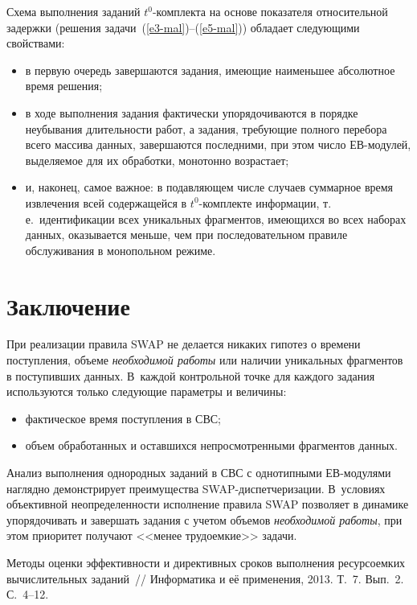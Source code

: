 \begin{multicols}{2}
Схема выполнения заданий $t^0$-ком\-плек\-та на основе показателя
относительной задержки (решения задачи~(\ref{e3-mal})--(\ref{e5-mal})) обладает следующими
свойствами:
\begin{itemize}
\item в первую очередь завершаются задания, име\-ющие наименьшее абсолютное время решения;
\item  в ходе выполнения  задания фактически упорядочиваются  в порядке неубывания 
длительности работ, а задания, требующие полного перебора всего массива данных, 
завершаются последними, при этом  число ЕВ-мо\-ду\-лей, выделяемое  для их обработки, 
монотонно воз\-рас\-тает;
\item  и, наконец, самое важное: в подавляющем чис\-ле случаев суммарное время 
извлечения всей содержащейся в $t^0$-ком\-плек\-те  информации, т.\,е.\ 
идентификации всех уникальных фрагментов, имеющихся во всех наборах данных, 
оказывается меньше, чем при последовательном правиле обслуживания в монопольном режиме.
\end{itemize}



\section{Заключение} 

При реализации правила SWAP не
делается никаких гипотез о времени поступления, объеме
\textit{необходимой работы} или наличии уникальных фрагментов в
поступивших данных. В~каждой контрольной точке для каждого задания
используются только следующие параметры и величины:
\begin{itemize}
\item  фактическое время поступления в СВС;
\item  объем обработанных и оставшихся непро\-смот\-рен\-ны\-ми фрагментов
данных.
\end{itemize}

Анализ выполнения однородных заданий в СВС с однотипными ЕВ-мо\-ду\-ля\-ми
наглядно демонстрирует преимущества SWAP-дис\-пет\-че\-ри\-за\-ции. В~условиях
объективной неопределенности   исполнение правила SWAP позволяет в
динамике  упорядочивать и завершать задания с учетом  объемов
\textit{необходимой работы}, при этом приоритет получают  <<менее
трудоемкие>> задачи.

{\small\frenchspacing
{%
\begin{thebibliography}{9}
Методы оценки эффективности и  директивных сроков выполнения  ресурсоемких 
вычислительных заданий~// Информатика и её применения, 2013. Т.~7. Вып.~2. С.~4--12.


\end{thebibliography}}}
\end{multicols}
